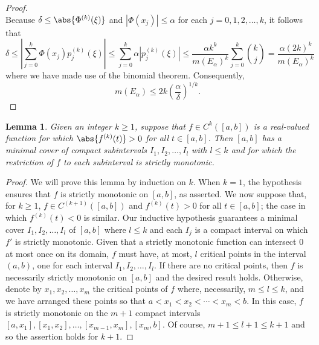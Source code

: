 \documentclass[11pt, letter]{book}
\newtheorem{lemma}[theorem]{Lemma}
\begin{document}
\begin{proof}
\begin{equation*}
\end{equation*}
Because $\delta\leq \abs{\Phi^{(k)}(\xi)}$ and $|\Phi(x_j)|\leq \alpha$ for each $j=0,1,2,\dots,k$, it follows that
\begin{equation*}
\delta\leq \left|\sum_{j=0}^k \Phi(x_j)p_j^{(k)}(\xi)\right|\leq \sum_{j=0}^k\alpha|p_j^{(k)}(\xi)|\leq \frac{\alpha k^k}{m(E_\alpha)^k}\sum_{j=0}^k{k\choose j}=\frac{\alpha (2k)^k}{m(E_\alpha)^k}
\end{equation*}
where we have made use of the binomial theorem. Consequently,
\begin{equation*}
    m(E_\alpha)\leq 2k\left(\frac{\alpha}{\delta}\right)^{1/k}.
\end{equation*}
\end{proof}

\begin{framed}
\begin{lemma}\label{lem:CriticalPoints} Given an integer $k \geq 1$, suppose that $f \in C^k([a,b])$ is a real-valued function for which $\abs{f^{(k)}(t)} > 0$ for all $t\in [a,b]$. Then $[a,b]$ has a minimal cover of compact subintervals $I_1,I_2,\dots,I_l$ with $l\leq k$ and for which the restriction of $f$ to each subinterval is strictly monotonic.
\end{lemma}
\end{framed}

\begin{proof}
We will prove this lemma by induction on $k$. When $k=1$, the hypothesis ensures that $f$ is strictly monotonic on $[a,b]$, as asserted. We now suppose that, for $k\geq 1$, $f\in C^{(k+1)}([a,b])$ and $f^{(k)}(t)>0$ for all $t\in [a,b]$; the case in which $f^{(k)}(t)<0$ is similar. Our inductive hypothesis guarantees a minimal cover $I_1,I_2,\dots,I_l$ of $[a,b]$ where $l\leq k$ and each $I_j$ is a compact interval on which $f'$ is strictly monotonic. Given that a strictly monotonic function can intersect $0$ at most once on its domain, $f$ must have, at most, $l$ critical points in the interval $(a,b)$, one for each interval $I_1,I_2,\dots,I_l$. If there are no critical points, then $f$ is necessarily strictly monotonic on $[a,b]$ and the desired result holds. Otherwise, denote by $x_1,x_2,\dots,x_m$ the critical points of $f$ where, necessarily, $m\leq l\leq k$, and we have arranged these points so that $a<x_1<x_2<\cdots<x_m<b$. In this case, $f$ is strictly monotonic on the $m+1$ compact intervals $[a,x_1],[x_1,x_2],\dots,[x_{m-1},x_m],[x_m,b]$. Of course, $m+1\leq l+1\leq k+1$ and so the assertion holds for $k+1$.
\end{proof}
\end{document}
